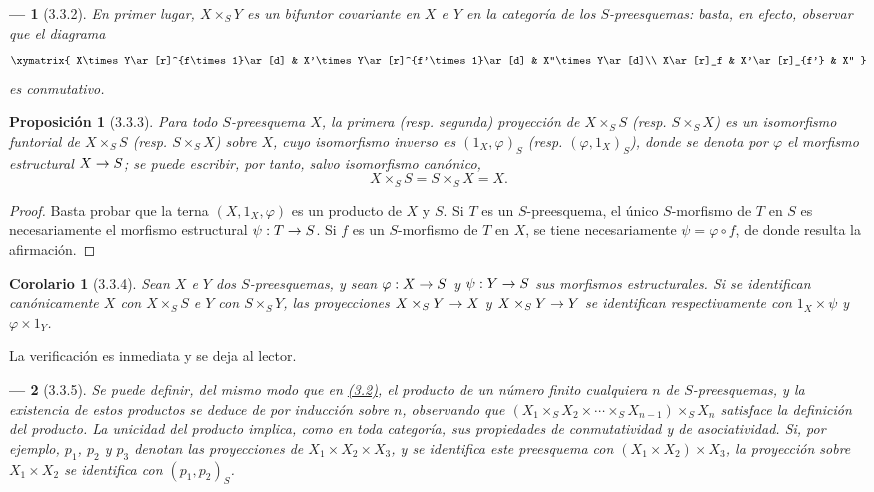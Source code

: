 \documentclass[oneside]{amsart}
\theoremstyle{ega-env-style}
\newtheorem*{env}{---}
\theoremstyle{ega-thm-env-style}
\newtheorem*{proposition}{Proposición}
\newtheorem*{corollary}{Corolario}
\theoremstyle{ega-defn-env-style}
\renewcommand{\to}{\mathchoice{\longrightarrow}{\rightarrow}{\rightarrow}{\rightarrow}}
\newcommand{\oldpage}[2][]{{\marginnote{\normalfont{\textbf{#1}~|~#2}}}\ignorespaces}
\let\EGAOriginalLabel\label
\renewcommand{\label}[1]{\phantomsection\EGAOriginalLabel{#1}}
\begin{document}
\begin{env}[3.3.2]
\label{I.3.3.2}
En primer lugar, $X\times_S Y$ es un \emph{bifuntor covariante} en $X$ e $Y$ en la
categoría de los $S$-preesquemas: basta, en efecto, observar que el diagrama
\[
  \xymatrix{
    X\times Y\ar[r]^{f\times 1}\ar[d] &
    X'\times Y\ar[r]^{f'\times 1}\ar[d] &
    X''\times Y\ar[d]\\
    X\ar[r]_f & X'\ar[r]_{f'} & X''
  }
\]
es conmutativo.
\end{env}

\begin{proposition}[3.3.3]
\label{I.3.3.3}
Para todo $S$-preesquema $X$, la primera \textup{(resp.} segunda) proyección de
$X\times_S S$ \textup{(resp. $S\times_S X$)} es un isomorfismo funtorial de
$X\times_S S$ \textup{(resp. $S\times_S X$)} sobre $X$, cuyo isomorfismo inverso es
$(1_X,\varphi)_S$ \textup{(resp. $(\varphi,1_X)_S$)}, donde se denota por $\varphi$ el
morfismo estructural $X\to S$; se puede escribir, por tanto, salvo isomorfismo
canónico,
\[
  X\times_S S=S\times_S X=X.
\]
\end{proposition}

\begin{proof}
Basta probar que la terna $(X,1_X,\varphi)$ es un producto de $X$ y $S$. Si $T$ es
un $S$-preesquema, el único $S$-morfismo de $T$ en $S$ es necesariamente el
morfismo estructural $\psi:T\to S$. Si $f$ es un $S$-morfismo de $T$ en $X$,
se tiene necesariamente $\psi=\varphi\circ f$, de donde resulta la afirmación.
\end{proof}

\begin{corollary}[3.3.4]
\label{I.3.3.4}
Sean $X$ e $Y$ dos $S$-preesquemas, y sean $\varphi:X\to S$ y $\psi:Y\to S$ sus
morfismos estructurales. Si se identifican canónicamente $X$ con $X\times_S S$
e $Y$ con $S\times_S Y$, las proyecciones $X\times_S Y\to X$ y
$X\times_S Y\to Y$ se identifican respectivamente con $1_X\times\psi$ y
$\varphi\times 1_Y$.
\end{corollary}

La verificación es inmediata y se deja al lector.

\begin{env}[3.3.5]
\label{I.3.3.5}
Se puede definir, del mismo modo que en \hyperref[subsection:I.3.2]{(3.2)}, el producto de un
\oldpage[I]{109}
número finito cualquiera $n$ de $S$-preesquemas, y la existencia de estos productos se deduce
de  por inducción sobre $n$, observando que
$(X_1\times_S X_2\times\cdots\times_S X_{n-1})\times_S X_n$ satisface la
definición del producto. La unicidad del producto implica, como en toda
categoría, sus propiedades de \emph{conmutatividad} y de \emph{asociatividad}. Si, por
ejemplo, $p_1$, $p_2$ y $p_3$ denotan las proyecciones de
$X_1\times X_2\times X_3$, y se identifica este preesquema con
$(X_1\times X_2)\times X_3$, la proyección sobre $X_1\times X_2$ se
identifica con $(p_1,p_2)_S$.
\end{env}
\end{document}

